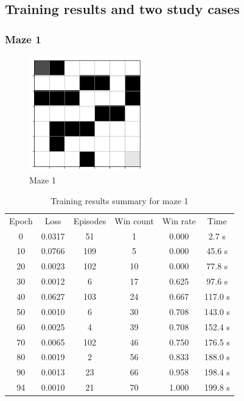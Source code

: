\documentclass[a4paper]{article}    %
\begin{document}
\subsection{Training results and two study cases}

\subsubsection{Maze 1}

\begin{figure}[H]
    \centering
    \includegraphics[width=5cm]{maze1-maze}
    \caption{Maze 1}
    \label{fig:maze1}
\end{figure}

\begin{table}[H]
    \begin{center}
        \begin{tabular}{|c|c|c|c|c|c|}
            \cline{1-6}
            \rowcolor{Gray}
            Epoch & Loss & Episodes & Win count & Win rate & Time \\
            \cline{1-6}
             0 & 0.0317 &  51 &  1 & 0.000 &   2.7 s \\
            10 & 0.0766 & 109 &  5 & 0.000 &  45.6 s \\
            20 & 0.0023 & 102 & 10 & 0.000 &  77.8 s \\
            30 & 0.0012 &   6 & 17 & 0.625 &  97.6 s \\
            40 & 0.0627 & 103 & 24 & 0.667 & 117.0 s \\
            50 & 0.0010 &   6 & 30 & 0.708 & 143.0 s \\
            60 & 0.0025 &   4 & 39 & 0.708 & 152.4 s \\
            70 & 0.0065 & 102 & 46 & 0.750 & 176.5 s \\
            80 & 0.0019 &   2 & 56 & 0.833 & 188.0 s \\
            90 & 0.0013 &  23 & 66 & 0.958 & 198.4 s \\
            94 & 0.0010 &  21 & 70 & 1.000 & 199.8 s \\
            \cline{1-6}
        \end{tabular}
    \end{center}
    \caption{Training results summary for maze 1}
    \label{tab:maze1-results}
\end{table}
\end{document}
